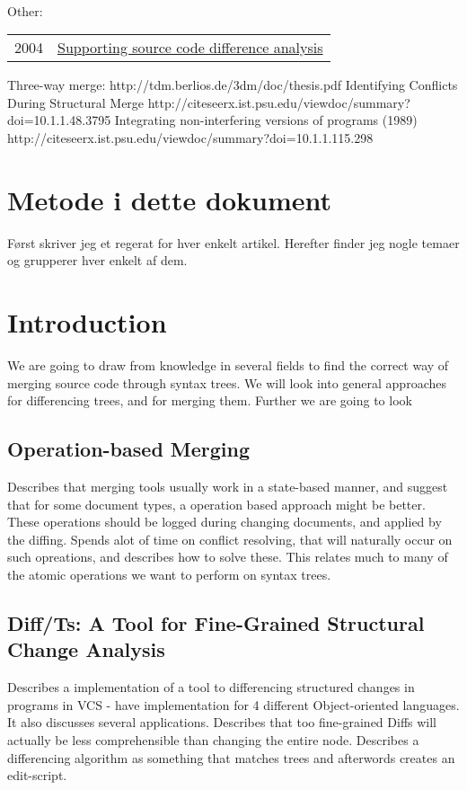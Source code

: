 \documentclass[12pt]{article}
\begin{document}
\\
Other: \\
\begin{tabular}{ | l | l | }
	2004 & \href{http://ieeexplore.ieee.org/xpls/abs_all.jsp?arnumber=1357805}{Supporting source code difference analysis } \\
\end{tabular}

Three-way merge:
http://tdm.berlios.de/3dm/doc/thesis.pdf
Identifying Conflicts During Structural Merge 	http://citeseerx.ist.psu.edu/viewdoc/summary?doi=10.1.1.48.3795
Integrating non-interfering versions of programs (1989)  http://citeseerx.ist.psu.edu/viewdoc/summary?doi=10.1.1.115.298



\section{Metode i dette dokument}
Først skriver jeg et regerat for hver enkelt artikel. Herefter finder jeg nogle temaer og grupperer hver enkelt af dem.

\section{Introduction}
We are going to draw from knowledge in several fields to find the correct way of merging source code through syntax trees. We will look into general approaches for differencing trees, and for merging them. Further we are going to look 	

\subsection{Operation-based Merging}
Describes that merging tools usually work in a state-based manner, and suggest that for some document types, a operation based approach might be better. These operations should be logged during changing documents, and applied by the diffing. Spends alot of time on conflict resolving, that will naturally occur on such opreations, and describes how to solve these. This relates much to many of the atomic operations we want to perform on syntax trees.

\subsection{Diff/Ts: A Tool for Fine-Grained Structural Change Analysis}
Describes a implementation of a tool to differencing structured changes in programs in VCS - have implementation for 4 different Object-oriented languages. It also discusses several applications. Describes that too fine-grained Diffs will actually be less comprehensible than changing the entire node. Describes a differencing algorithm as something that matches trees and afterwords creates an edit-script.
\end{document}
